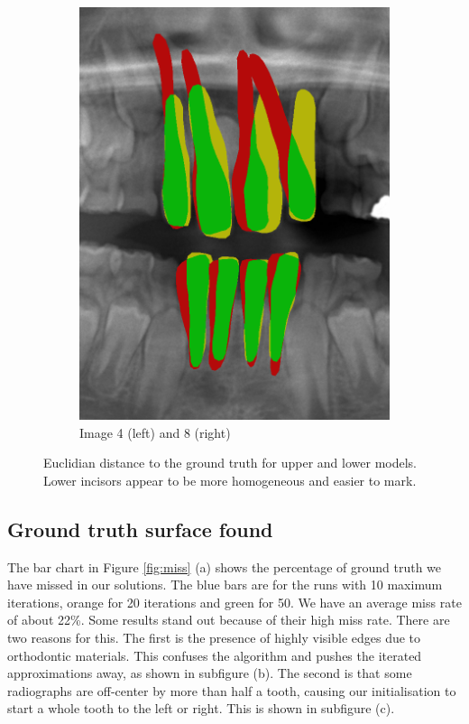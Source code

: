 \documentclass[a4paper,titlepage,12pt]{article}
\begin{document}
\begin{figure}
\begin{subfigure}{0.65\linewidth}
		\includegraphics[width=0.45\columnwidth]{results/4i50}
		\caption{Image 4 (left) and 8 (right)}
	\end{subfigure}
	\caption{Euclidian distance to the ground truth for upper and lower models. Lower incisors appear to be more homogeneous and easier to mark. } 
	\label{fig:euclud}
\end{figure}

\subsection{Ground truth surface found}
The bar chart in Figure \ref{fig:miss} (a) shows the percentage of ground truth we have missed in our solutions. The {\color{blue} blue} bars are for the runs with 10 maximum iterations, {\color{orange} orange} for 20 iterations and {\color{green} green} for 50. We have an average miss rate of about 22\%. Some results stand out because of their high miss rate. There are two reasons for this. The first is the presence of highly visible edges due to orthodontic materials. This confuses the algorithm and pushes the iterated approximations away, as shown in subfigure (b). The second is that some radiographs are off-center by more than half a tooth, causing our initialisation to start a whole tooth to the left or right. This is shown in subfigure (c). 
\end{document}
